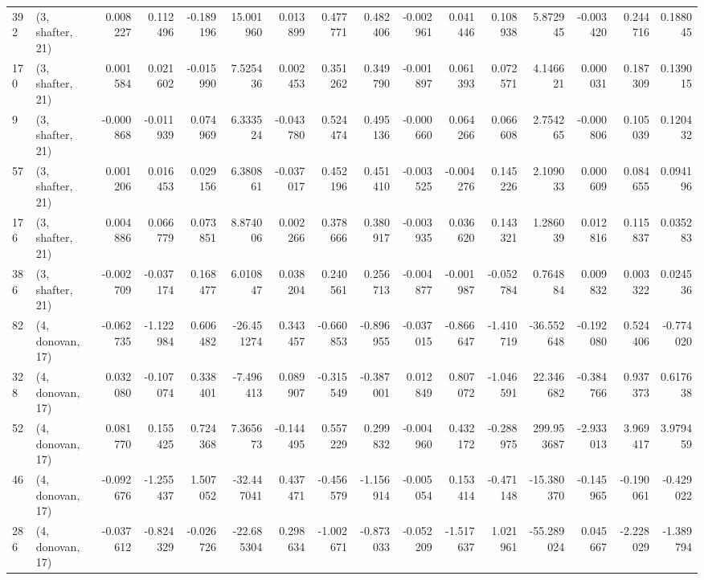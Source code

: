 \begin{tabular}{llrrrrrrrrrrrrrr}
392 &  (3, shafter, 21) &   0.008227 &  0.112496 & -0.189196 &   15.001960 &  0.013899 &   0.477771 &  0.482406 & -0.002961 &  0.041446 &  0.108938 &    5.872945 & -0.003420 &  0.244716 &  0.188045 \\
170 &  (3, shafter, 21) &   0.001584 &  0.021602 & -0.015990 &    7.525436 &  0.002453 &   0.351262 &  0.349790 & -0.001897 &  0.061393 &  0.072571 &    4.146621 &  0.000031 &  0.187309 &  0.139015 \\
9   &  (3, shafter, 21) &  -0.000868 & -0.011939 &  0.074969 &    6.333524 & -0.043780 &   0.524474 &  0.495136 & -0.000660 &  0.064266 &  0.066608 &    2.754265 & -0.000806 &  0.105039 &  0.120432 \\
57  &  (3, shafter, 21) &   0.001206 &  0.016453 &  0.029156 &    6.380861 & -0.037017 &   0.452196 &  0.451410 & -0.003525 & -0.004276 &  0.145226 &    2.109033 &  0.000609 &  0.084655 &  0.094196 \\
176 &  (3, shafter, 21) &   0.004886 &  0.066779 &  0.073851 &    8.874006 &  0.002266 &   0.378666 &  0.380917 & -0.003935 &  0.036620 &  0.143321 &    1.286039 &  0.012816 &  0.115837 &  0.035283 \\
386 &  (3, shafter, 21) &  -0.002709 & -0.037174 &  0.168477 &    6.010847 &  0.038204 &   0.240561 &  0.256713 & -0.004877 & -0.001987 & -0.052784 &    0.764884 &  0.009832 &  0.003322 &  0.024536 \\
82  &  (4, donovan, 17) &  -0.062735 & -1.122984 &  0.606482 &  -26.451274 &  0.343457 &  -0.660853 & -0.896955 & -0.037015 & -0.866647 & -1.410719 &  -36.552648 & -0.192080 &  0.524406 & -0.774020 \\
328 &  (4, donovan, 17) &   0.032080 & -0.107074 &  0.338401 &   -7.496413 &  0.089907 &  -0.315549 & -0.387001 &  0.012849 &  0.807072 & -1.046591 &   22.346682 & -0.384766 &  0.937373 &  0.617638 \\
52  &  (4, donovan, 17) &   0.081770 &  0.155425 &  0.724368 &    7.365673 & -0.144495 &   0.557229 &  0.299832 & -0.004960 &  0.432172 & -0.288975 &  299.953687 & -2.933013 &  3.969417 &  3.979459 \\
46  &  (4, donovan, 17) &  -0.092676 & -1.255437 &  1.507052 &  -32.447041 &  0.437471 &  -0.456579 & -1.156914 & -0.005054 &  0.153414 & -0.471148 &  -15.380370 & -0.145965 & -0.190061 & -0.429022 \\
286 &  (4, donovan, 17) &  -0.037612 & -0.824329 & -0.026726 &  -22.685304 &  0.298634 &  -1.002671 & -0.873033 & -0.052209 & -1.517637 &  1.021961 &  -55.289024 &  0.045667 & -2.228029 & -1.389794 \\

\end{tabular}
